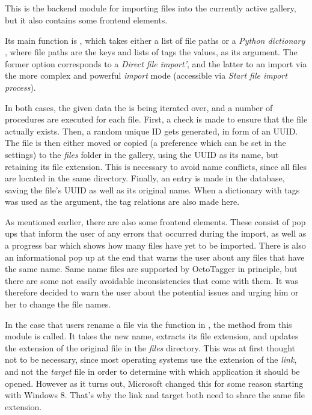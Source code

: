 \subsection{}
\def\kapitelautor{Erik Ritschl}

This is the backend module for importing files into the currently active
gallery, but it also contains some frontend elements.

Its main function is , which takes either a
list of file paths or a \emph{Python dictionary} \cite{PythonDict}, where file paths are the keys and
lists of tags the values, as its argument. The former option corresponds to a
\emph{Direct file import'}, and the latter to an import via the more complex and
powerful \emph{import} mode (accessible via \emph{Start file import process}).

In both cases, the given data the is being iterated over, and a number of
procedures are executed for each file. First, a check is made to ensure that
the file actually exists. Then, a random unique ID gets generated, in form of
an UUID. The file is then either moved or copied (a preference
which can be set in the settings) to the \emph{files} folder in the gallery,
using the UUID as its name, but retaining its file extension. This is necessary to avoid name
conflicts, since all files are located in the same directory. Finally, an entry
is made in the database, saving the file's UUID as well as its
original name. When a dictionary with tags was used as the argument, the tag relations
are also made here.

As mentioned earlier, there are also some frontend elements. These consist of
pop ups that inform the user of any errors that occurred during the import, as
well as a progress bar which shows how many files have yet to be imported.
There is also an informational pop up at the end that warns the user about any
files that have the same name. Same name files are supported by OctoTagger in
principle, but there are some not easily avoidable inconsistencies that come
with them. It was therefore decided to warn the user about the potential issues
and urging him or her to change the file names.

In the case that users rename a file via the  function in , the method  from this module is called. It takes the new name, extracts its file extension, and updates the extension of the original file in the \emph{files} directory. This was at first thought not to be necessary, since most operating systems use the extension of the \emph{link}, and not the \emph{target} file in order to determine with which application it should be opened. However as it turns out, Microsoft changed this for some reason starting with Windows 8. That's why the link and target both need to share the same file extension.